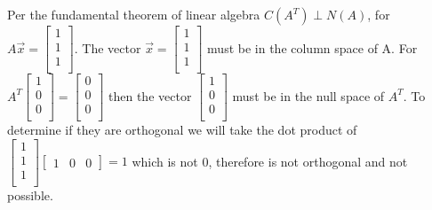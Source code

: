 				Per the fundamental theorem of linear algebra $C(A^T) \perp N(A)$, for $A\vec{x} = \begin{bmatrix}
				    1 \\
				    1 \\
				    1 \\
				\end{bmatrix}$.
				The vector 
				$\vec{x} = \begin{bmatrix}
				    1 \\
				    1 \\
				    1 \\
				\end{bmatrix}$
				must be in the column space of A.  For 
				$A^T \begin{bmatrix}
				    1 \\
				    0 \\
				    0 \\
				\end{bmatrix} = 
				\begin{bmatrix}
				    0 \\
				    0 \\
				    0 \\
				\end{bmatrix} $ then the vector
				$\begin{bmatrix}
				    1 \\
				    0 \\
				    0 \\
				\end{bmatrix}$ must be in the null space of $A^T$. To determine if they are orthogonal we will take the dot product of $\begin{bmatrix}
				    1 \\
				    1 \\
				    1 \\
				\end{bmatrix}\begin{bmatrix}
                    1 & 0 & 0
				\end{bmatrix} =  1$ which is not 0, therefore is not orthogonal and not possible.